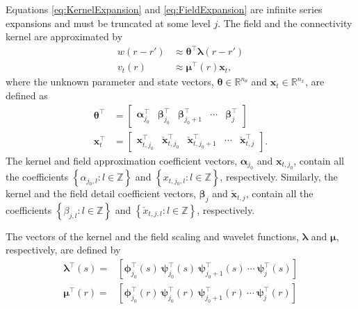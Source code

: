 \documentclass[journal]{IEEEtran}
\begin{document}
Equations \eqref{eq:KernelExpansion} and \eqref{eq:FieldExpansion} are infinite series expansions and must be truncated at some level $j$. The field and the connectivity kernel are approximated by
\begin{align}
	w\left(r-r'\right) &\approx \boldsymbol\theta^\top\boldsymbol\lambda\left(r-r'\right) 
	\label{eq:KernelFiniteExpansion} \\
	v_t\left(r\right) &\approx \boldsymbol\mu^\top\left(r\right)\mathbf{x}_t,
	\label{eq:FieldFiniteExpansion}
\end{align}
where the unknown parameter and state vectors, $\boldsymbol\theta \in \mathbb{R}^{n_{\theta}}$ and $\mathbf{x}_t \in \mathbb{R}^{n_x}$, are defined as 
\begin{align}
\boldsymbol\theta^\top &=[\begin{array}{ccccc} \boldsymbol\alpha_{j_0}^\top & \boldsymbol\beta_{j_0}^\top & \boldsymbol\beta_{j_0+1}^\top & \cdots & \boldsymbol\beta_{j}^\top \end{array}] 
\label{KernelWeights} \\
\mathbf{x}_{t}^\top &=[\begin{array}{ccccc}\mathbf{x}_{t,j_{0}}^\top &  \check{\mathbf{x}}_{t,j_{0}}^\top & \check{\mathbf{x}}_{t,j_{0}+1}^\top & \cdots & \check{\mathbf{x}}_{t,j}^\top\end{array}].
\label{FieldWeights}
\end{align}
The kernel and field approximation coefficient vectors, $\boldsymbol \alpha_{j_0}$ and $\mathbf{x}_{t,j_{0}}$, contain all the coefficients $\left\lbrace\alpha_{j_0, l}:l \in \mathbb{Z} \right\rbrace $ and $\left\lbrace x_{t,j_0, l}: l \in \mathbb{Z}\right\rbrace$, respectively. Similarly, the kernel and the field detail coefficient vectors, $\boldsymbol\beta_{j}$ and $\check{\mathbf{x}}_{t,j}$, contain all the coefficients $\left\lbrace \beta_{j,l} :l \in \mathbb{Z}\right\rbrace$ and $\left\lbrace  \check x_{t,j, l}:l \in \mathbb{Z}\right\rbrace$, respectively.

The vectors of the kernel and the field scaling and wavelet functions, $\boldsymbol\lambda$ and $\boldsymbol\mu$, respectively, are defined by
\begin{align}
    \label{KernelBasisVector}
    \boldsymbol\lambda^\top(s)=&\left[
    \boldsymbol\phi_{j_0}^\top(s) ~
    \boldsymbol\psi_{j_0}^\top(s) ~ 
    \boldsymbol\psi_{j_0+1}^\top(s) ~
    \cdots ~
    \boldsymbol\psi_{j}^\top(s)\right] \\
    \label{FieldBasisVector}
    \boldsymbol\mu^\top (r) =& \left[
    \boldsymbol\phi_{j_0}^\top(r) ~ 
    \boldsymbol\psi_{j_0}^\top(r) ~ 
    \boldsymbol\psi_{j_0+1}^\top(r) ~ 
    \cdots ~ 
    \boldsymbol\psi_{j}^\top(r)
\right]   
\end{align}
\end{document}
